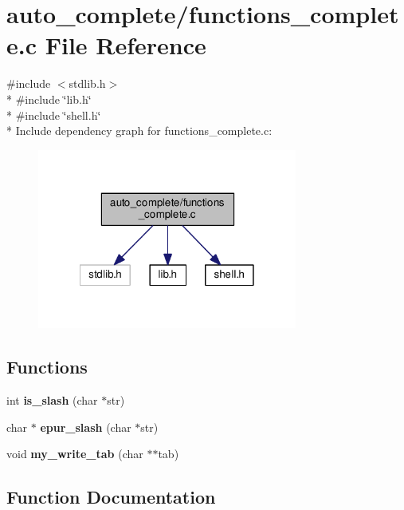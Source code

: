 \section{auto\-\_\-complete/functions\-\_\-complete.c File Reference}
\label{functions__complete_8c}
{\ttfamily \#include $<$stdlib.\-h$>$}\\*
{\ttfamily \#include \char`\"{}lib.\-h\char`\"{}}\\*
{\ttfamily \#include \char`\"{}shell.\-h\char`\"{}}\\*
Include dependency graph for functions\-\_\-complete.\-c\-:\nopagebreak
\begin{figure}[H]
\begin{center}
\leavevmode
\includegraphics[width=242pt]{functions__complete_8c__incl}
\end{center}
\end{figure}
\subsection*{Functions}
\begin{DoxyCompactItemize}
\item 
int {\bf is\-\_\-slash} (char $\ast$str)
\item 
char $\ast$ {\bf epur\-\_\-slash} (char $\ast$str)
\item 
void {\bf my\-\_\-write\-\_\-tab} (char $\ast$$\ast$tab)
\end{DoxyCompactItemize}


\subsection{Function Documentation}

